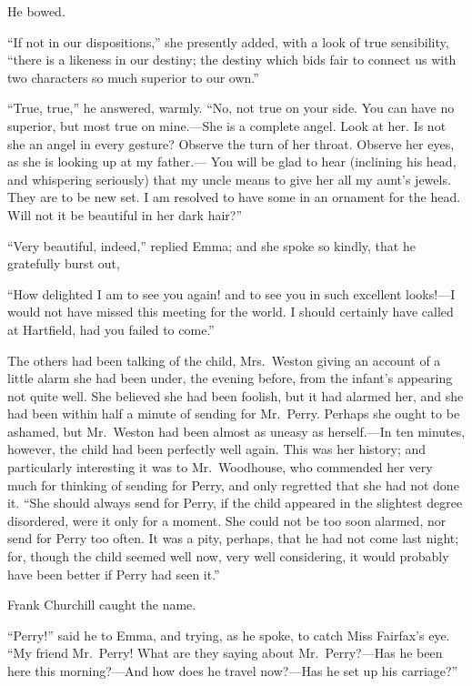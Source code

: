 He bowed.

``If not in our dispositions,'' she presently added, with a look of
true sensibility, ``there is a likeness in our destiny; the destiny
which bids fair to connect us with two characters so much superior
to our own.''

``True, true,'' he answered, warmly.  ``No, not true on your side.  You can
have no superior, but most true on mine.---She is a complete angel.
Look at her.  Is not she an angel in every gesture?  Observe the turn
of her throat.  Observe her eyes, as she is looking up at my father.---%
You will be glad to hear (inclining his head, and whispering seriously)
that my uncle means to give her all my aunt's jewels.  They are to be
new set.  I am resolved to have some in an ornament for the head.
Will not it be beautiful in her dark hair?''

``Very beautiful, indeed,'' replied Emma; and she spoke so kindly,
that he gratefully burst out,

``How delighted I am to see you again! and to see you in such
excellent looks!---I would not have missed this meeting for the world.
I should certainly have called at Hartfield, had you failed to come.''

The others had been talking of the child, Mrs.\ Weston giving an
account of a little alarm she had been under, the evening before,
from the infant's appearing not quite well.  She believed she had
been foolish, but it had alarmed her, and she had been within half
a minute of sending for Mr.\ Perry.  Perhaps she ought to be ashamed,
but Mr.\ Weston had been almost as uneasy as herself.---In ten minutes,
however, the child had been perfectly well again.  This was
her history; and particularly interesting it was to Mr.\ Woodhouse,
who commended her very much for thinking of sending for Perry,
and only regretted that she had not done it.  ``She should always send
for Perry, if the child appeared in the slightest degree disordered,
were it only for a moment.  She could not be too soon alarmed,
nor send for Perry too often.  It was a pity, perhaps, that he
had not come last night; for, though the child seemed well now,
very well considering, it would probably have been better if Perry
had seen it.''

Frank Churchill caught the name.

``Perry!'' said he to Emma, and trying, as he spoke, to catch Miss
Fairfax's eye.  ``My friend Mr.\ Perry!  What are they saying
about Mr.\ Perry?---Has he been here this morning?---And how does
he travel now?---Has he set up his carriage?''

